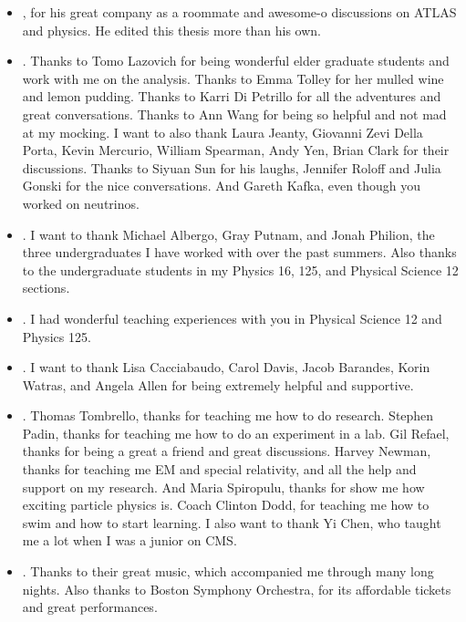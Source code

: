 \begin{itemize}
	\item {}, for his great company as a roommate and awesome-o discussions on ATLAS and physics. He edited this thesis more than his own.
	\item {}. Thanks to Tomo Lazovich for being wonderful elder graduate students and work with me on the analysis. Thanks to Emma Tolley for her mulled wine and lemon pudding. Thanks to Karri Di Petrillo for all the adventures and great conversations. Thanks to Ann Wang for being so helpful and not mad at my mocking. I want to also thank Laura Jeanty, Giovanni Zevi Della Porta, Kevin Mercurio, William Spearman, Andy Yen, Brian Clark for their discussions. Thanks to Siyuan Sun for his laughs, Jennifer Roloff and Julia Gonski for the nice conversations. And Gareth Kafka, even though you worked on neutrinos.
	\item {}. I want to thank Michael Albergo, Gray Putnam, and Jonah Philion, the three undergraduates I have worked with over the past summers. Also thanks to the undergraduate students in my Physics 16, 125, and Physical Science 12 sections.
	\item {}. I had wonderful teaching experiences with you in Physical Science 12 and Physics 125.
	\item {}. I want to thank Lisa Cacciabaudo, Carol Davis, Jacob Barandes, Korin Watras, and Angela Allen for being extremely helpful and supportive.
	\item {}. Thomas Tombrello, thanks for teaching me how to do research. Stephen Padin, thanks for teaching me how to do an experiment in a lab. Gil Refael, thanks for being a great a friend and great discussions. Harvey Newman, thanks for teaching me EM and special relativity, and all the help and support on my research. And Maria Spiropulu, thanks for show me how exciting particle physics is. Coach Clinton Dodd, for teaching me how to swim and how to start learning. I also want to thank Yi Chen, who taught me a lot when I was a junior on CMS.
	\item {}. Thanks to their great music, which accompanied me through many long nights. Also thanks to Boston Symphony Orchestra, for its affordable tickets and great performances.

\end{itemize}
